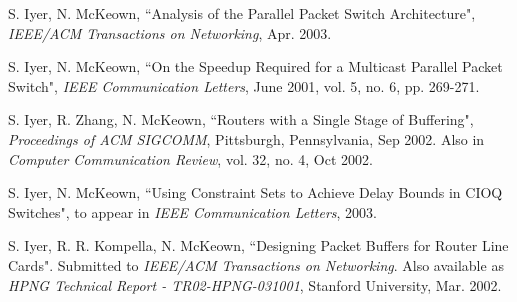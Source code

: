 \documentclass[a4paper, 12pt]{article}
\begin{document}
\begin{small}
\vspace{0.5cm}

\end{small}

\begin{footnotesize}

\begin{thebibliography}{}


S. Iyer, N. McKeown, ``Analysis of the Parallel Packet Switch Architecture", {\it IEEE/ACM Transactions on Networking}, Apr. 2003.

S. Iyer, N. McKeown, ``On the Speedup Required for a Multicast Parallel Packet Switch",
{\it IEEE Communication Letters}, June 2001, vol. 5, no. 6, pp. 269-271.

S. Iyer, R. Zhang, N. McKeown,
``Routers with a Single Stage of Buffering",
{\it Proceedings of ACM SIGCOMM}, Pittsburgh, Pennsylvania, Sep 2002. Also in
{\it Computer Communication Review}, vol. 32, no. 4, Oct 2002.

S. Iyer, N. McKeown, ``Using Constraint Sets to Achieve Delay Bounds in CIOQ Switches",
to appear in {\it IEEE Communication Letters}, 2003.



S. Iyer, R. R. Kompella, N. McKeown, ``Designing Packet Buffers for
Router Line Cards". Submitted to {\it IEEE/ACM Transactions on
Networking}. Also available as  {\it HPNG Technical Report -
TR02-HPNG-031001}, Stanford University, Mar. 2002.



\end{thebibliography}
\end{footnotesize}
\end{document}
